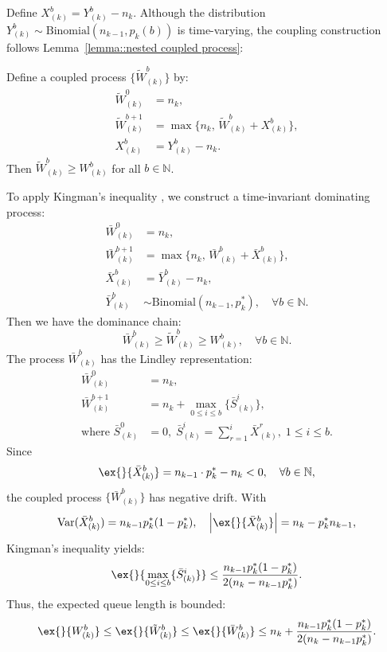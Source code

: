 Define $X_{(k)}^b = Y_{(k)}^b - n_k$. Although the distribution $Y_{(k)}^b\sim \text{Binomial}(n_{k-1},p_k(b))$ is time-varying, the coupling construction follows Lemma~\ref{lemma::nested coupled process}:
\begin{lemma}\label{lemma: coupling, time varying}
Define a coupled process $\{ \tilde{W}_{(k)}^b\}$ by:
\begin{equation*}
\begin{aligned}
\tilde{W}_{(k)}^0 &= n_k, \\
\tilde{W}_{(k)}^{b+1} &= \max\{ n_k, \, \tilde{W}_{(k)}^b+X_{(k)}^b\}, \\
X_{(k)}^b &= Y_{(k)}^b - n_k.
\end{aligned}
\end{equation*}
Then $\tilde{W}^b_{(k)}\geq W^b_{(k)}$ for all $b\in \mathbb{N}$.
\end{lemma}
To apply Kingman's inequality \citep{kingman1962queues}, we construct a time-invariant dominating process:
\begin{equation*}
\begin{aligned}
\bar{W}_{(k)}^0 &= n_k, \\
\bar{W}_{(k)}^{b+1} &= \max\{ n_k,\, \bar{W}_{(k)}^{b}+\bar{X}_{(k)}^b \}, \\
\bar{X}_{(k)}^b &= \bar{Y}_{(k)}^b  -n_k, \\
\bar{Y}_{(k)}^b &\sim \text{Binomial}(n_{k-1}, p_k^*), \quad \forall b\in \mathbb{N}.
\end{aligned}
\end{equation*}
Then we have the dominance chain:
$$\bar{W}^b_{(k)}\geq \tilde{W}^b_{(k)}\geq W^b_{(k)},\quad \forall b\in \mathbb{N}.$$
The process $\bar{W}^b_{(k)}$ has the Lindley representation:
\begin{equation*}
\begin{aligned}
\bar{W}_{(k)}^0 &= n_k, \\
\bar{W}_{(k)}^{b+1} &= n_k + \max_{0\leq i\leq b}\{ \bar{S}_{(k)}^i \}, \\
\text{where } \bar{S}_{(k)}^0 &= 0,\; \bar{S}_{(k)}^i = \sum_{r=1}^i \bar{X}_{(k)}^{r},\; 1\leq i\leq b.
\end{aligned}
\end{equation*}
Since
$$ \ex{}{\bar{X}_{(k)}^b} = n_{k-1}\cdot p_{k}^* - n_k <0,\quad \forall b\in \mathbb{N}, $$
the coupled process $\{\bar{W}_{(k)}^b \}$ has negative drift. With
$$\text{Var}(\bar{X}_{(k)}^b) = n_{k-1}p_k^*(1-p_k^*),\quad \left|\ex{}{\bar{X}_{(k)}^b}\right|=n_k - p_k^* n_{k-1},$$
Kingman's inequality \citep{kingman1962queues} yields:
$$\ex{}{\max_{0\leq i\leq b}\{ \bar{S}_{(k)}^i \}  }\leq  \frac{  n_{k-1}p_k^*(1-p_k^*) }{ 2(n_k - n_{k-1}p_k^*)}. $$
Thus, the expected queue length is bounded:
$$\ex{}{W_{(k)}^b}\leq \ex{}{\tilde{W}_{(k)}^b}\leq \ex{}{\bar{W}_{(k)}^b} \leq n_k + \frac{  n_{k-1}p_k^*(1-p_k^*) }{ 2(n_k - n_{k-1}p_k^*)}.$$
